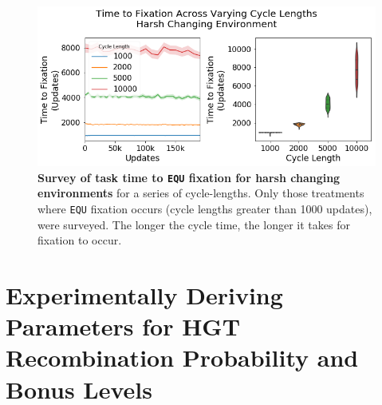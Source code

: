 \documentclass[PhD]{msu-thesis}
\begin{document}
\begin{appendices}

	\begin{figure}[!h]

	\includegraphics[width=0.95\columnwidth]{figures/A1/a1-timetofixation-harsh.png}
	\caption{\textbf{Survey of task time to \texttt{EQU} fixation for harsh changing environments} for a series of cycle-lengths. Only those treatments where \texttt{EQU} fixation occurs (cycle lengths greater than 1000 updates), were surveyed. The longer the cycle time, the longer it takes for fixation to occur.%
	}
	\label{fig:a1-timetofixation}
	\end{figure}

\chapter{Experimentally Deriving Parameters for HGT Recombination Probability and Bonus Levels}
\label{appendix:hgt_sweep}


\end{appendices}
\end{document}
